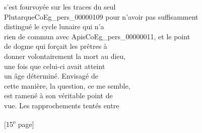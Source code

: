 \documentclass{book}
\begin{document}
{\begin{paracol}{2}
s’est fourvoyée sur les traces du seul\\
Plutarque\gls{CoEg_pers_00000109} pour n’avoir pas suffisamment\\
distingué le cycle lunaire qui n’a\\
rien de commun avec Apis\gls{CoEg_pers_00000011}, et le point\\
de dogme qui forçait les prêtres à\\
donner volontairement la mort au dieu,\\
une fois que celui-ci avait atteint\\
un âge déterminé. Envisagé de\\
cette manière, la question, ce me semble,\\
est ramené à son véritable point de\\
vue. Les rapprochements tentés entre
\end{paracol}

{\footnotesize\begin{center} {[15\textsuperscript{e} page]}\end{center}}

}
\end{document}
